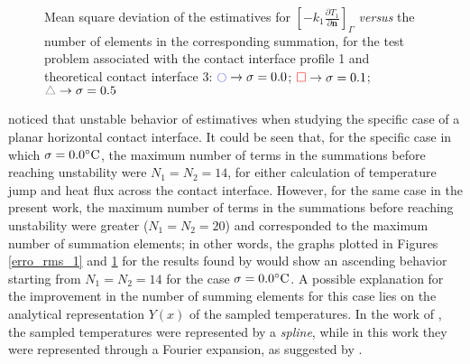 \documentclass[12pt]{CHT-20}
\begin{document}
\begin{figure}[H]
	\begin{center}			
		\caption{Mean square deviation of the estimatives for $\left[-k_1 \frac{\partial T_1}{\partial \mathbf{n}}\right]_\Gamma$ \textit{versus} the number of  elements in the corresponding summation, for the test problem associated with the contact interface profile 1 and theoretical contact interface 3: $\textcolor{blue}{\ocircle} \rightarrow \sigma = 0.0$; $\textcolor{red}{\square} \rightarrow \sigma = 0.1$; $\textcolor{gray}{\triangle} \rightarrow \sigma = 0.5$}
		\label{erro_rms_2}
	\end{center}
\end{figure}

\cite{artigo_padilha_3} noticed that unstable behavior of estimatives when studying the specific case of a planar horizontal contact interface. It could be seen that, for the specific case in which $\sigma = 0.0\celsius$, the maximum number of terms in the summations before reaching unstability were $N_1=N_2=14$, for either calculation of temperature jump and heat flux across the contact interface. However, for the same case in the present work, the maximum number of terms in the summations before reaching unstability were greater ($N_1=N_2=20$) and corresponded to the maximum number of summation elements; in other words, the graphs plotted in Figures \ref{erro_rms_1} and \ref{erro_rms_2} for the results found by \cite{artigo_padilha_3} would show an ascending behavior starting from $N_1=N_2=14$ for the case $\sigma = 0.0\celsius$. A possible explanation for the improvement in the number of summing elements for this case lies on the analytical representation $Y(x)$ of the sampled temperatures. In the work of \cite{artigo_padilha_3}, the sampled temperatures were represented by a \textit{spline}, while in this work they were represented through a Fourier expansion, as suggested by \cite{artigo_mocerino}.
\end{document}
